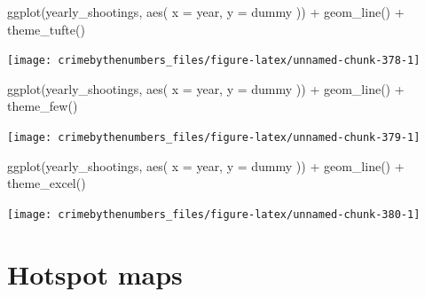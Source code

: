 \documentclass[
]{krantz}
\makeatletter
\newenvironment{Shaded}{\begin{snugshade}}{\end{snugshade}}
\newcommand{\AttributeTok}[1]{\textcolor[rgb]{0.61,0.61,0.61}{#1}}
\newcommand{\FunctionTok}[1]{\textcolor[rgb]{0,0,0}{#1}}
\newcommand{\NormalTok}[1]{#1}
\newcommand{\SpecialCharTok}[1]{\textcolor[rgb]{0,0,0}{#1}}
\newenvironment{kframe}{%
\medskip{}
\setlength{\fboxsep}{.8em}
 \def\at@end@of@kframe{}%
 \ifinner\ifhmode%
  \def\at@end@of@kframe{\end{minipage}}%
  \begin{minipage}{\columnwidth}%
 \fi\fi%
 \def\FrameCommand##1{\hskip\@totalleftmargin \hskip-\fboxsep
 \colorbox{shadecolor}{##1}\hskip-\fboxsep
     \hskip-\linewidth \hskip-\@totalleftmargin \hskip\columnwidth}%
 \MakeFramed {\advance\hsize-\width
   \@totalleftmargin\z@ \linewidth\hsize
   \@setminipage}}%
 {\par\unskip\endMakeFramed%
 \at@end@of@kframe}
\renewenvironment{Shaded}{\begin{kframe}}{\end{kframe}}
\makeatother
\begin{document}
\begin{Shaded}
\begin{Highlighting}[]
\FunctionTok{ggplot}\NormalTok{(yearly\_shootings, }\FunctionTok{aes}\NormalTok{(}
  \AttributeTok{x =}\NormalTok{ year,}
  \AttributeTok{y =}\NormalTok{ dummy}
\NormalTok{)) }\SpecialCharTok{+}
  \FunctionTok{geom\_line}\NormalTok{() }\SpecialCharTok{+}
  \FunctionTok{theme\_tufte}\NormalTok{()}
\end{Highlighting}
\end{Shaded}

\begin{center}\texttt{[image: crimebythenumbers\_files/figure-latex/unnamed-chunk-378-1]} \end{center}

\begin{Shaded}
\begin{Highlighting}[]
\FunctionTok{ggplot}\NormalTok{(yearly\_shootings, }\FunctionTok{aes}\NormalTok{(}
  \AttributeTok{x =}\NormalTok{ year,}
  \AttributeTok{y =}\NormalTok{ dummy}
\NormalTok{)) }\SpecialCharTok{+}
  \FunctionTok{geom\_line}\NormalTok{() }\SpecialCharTok{+}
  \FunctionTok{theme\_few}\NormalTok{()}
\end{Highlighting}
\end{Shaded}

\begin{center}\texttt{[image: crimebythenumbers\_files/figure-latex/unnamed-chunk-379-1]} \end{center}

\begin{Shaded}
\begin{Highlighting}[]
\FunctionTok{ggplot}\NormalTok{(yearly\_shootings, }\FunctionTok{aes}\NormalTok{(}
  \AttributeTok{x =}\NormalTok{ year,}
  \AttributeTok{y =}\NormalTok{ dummy}
\NormalTok{)) }\SpecialCharTok{+}
  \FunctionTok{geom\_line}\NormalTok{() }\SpecialCharTok{+}
  \FunctionTok{theme\_excel}\NormalTok{()}
\end{Highlighting}
\end{Shaded}

\begin{center}\texttt{[image: crimebythenumbers\_files/figure-latex/unnamed-chunk-380-1]} \end{center}

\hypertarget{hotspot-maps}{%
\chapter{Hotspot maps}\label{hotspot-maps}}
\end{document}
